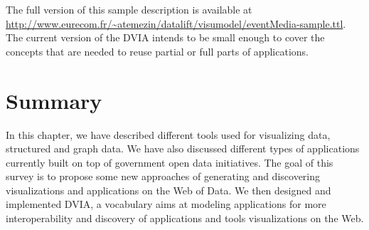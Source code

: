 The full version of this sample description is available at \url{http://www.eurecom.fr/~atemezin/datalift/visumodel/eventMedia-sample.ttl}. The current version of the DVIA intends to be small enough to cover the concepts that are needed to reuse partial or full parts of applications.

\section{Summary}
In this chapter, we have described different tools used for visualizing data, structured and graph data. We have also discussed different types of applications currently built on top of government open data initiatives. The goal of this survey is to propose some new approaches of generating and discovering visualizations and applications on the Web of Data. We then designed and implemented DVIA, a vocabulary aims at modeling applications for more interoperability and discovery of applications and tools visualizations on the Web.
